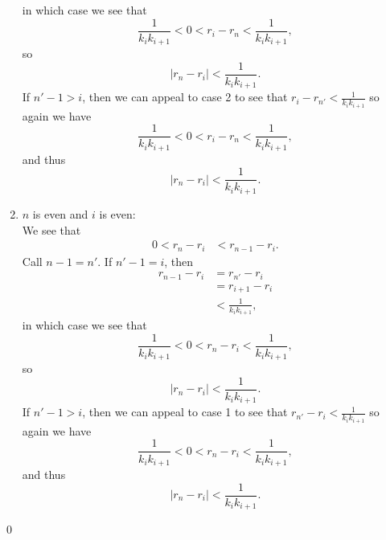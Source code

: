 \documentclass[12 pt]{amsart}
\begin{document}
\begin{enumerate}[(1)]
      in which case we see that 
      \[
        \frac{1}{k_i k_{i+1}} < 0 < r_i - r_n < \frac{1}{k_i k_{i+1}},
      \]
      so 
      \[
        | r_n - r_i | < \frac{1}{k_i k_{i+1}}.
      \]
      If $n' - 1 > i$, then we can appeal to case 2 to
      see that $r_i - r_{n'} < \frac{1}{k_i k_{i+1}}$ 
      so again we have
      \[
        \frac{1}{k_i k_{i+1}} < 0 < r_i - r_n < \frac{1}{k_i k_{i+1}},
      \]
      and thus
      \[
        | r_n - r_i | < \frac{1}{k_i k_{i+1}}.
      \]
    \item $n$ is even and $i$ is even: \\
      We see that 
      \begin{align*}
        0 < r_n - r_i &< r_{n-1} - r_{i}.
      \end{align*}
      Call $n - 1 = n'$.
      If $n' - 1 = i$, then
      \begin{align*}
        r_{n-1} - r_{i} &= r_{n'} - r_{i} \\
                        &= r_{i+1} - r_{i} \\
                        &< \frac{1}{k_i k_{i+1}},
      \end{align*}
      in which case we see that 
      \[
        \frac{1}{k_i k_{i+1}} < 0 < r_n - r_i < \frac{1}{k_i k_{i+1}},
      \]
      so 
      \[
        | r_n - r_i | < \frac{1}{k_i k_{i+1}}.
      \]
      If $n' - 1 > i$, then we can appeal to case 1 to
      see that $r_{n'} - r_{i} < \frac{1}{k_i k_{i+1}}$ 
      so again we have
      \[
        \frac{1}{k_i k_{i+1}} < 0 < r_n - r_i < \frac{1}{k_i k_{i+1}},
      \]
      and thus
      \[
        | r_n - r_i | < \frac{1}{k_i k_{i+1}}.
      \]
  \end{enumerate}
  \qed
\vfill
\newpage
\end{document}
